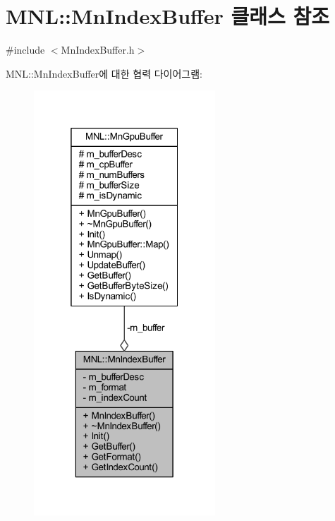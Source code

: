 \hypertarget{class_m_n_l_1_1_mn_index_buffer}{}\section{M\+NL\+:\+:Mn\+Index\+Buffer 클래스 참조}
\label{class_m_n_l_1_1_mn_index_buffer}


{\ttfamily \#include $<$Mn\+Index\+Buffer.\+h$>$}



M\+NL\+:\+:Mn\+Index\+Buffer에 대한 협력 다이어그램\+:\nopagebreak
\begin{figure}[H]
\begin{center}
\leavevmode
\includegraphics[width=193pt]{class_m_n_l_1_1_mn_index_buffer__coll__graph}
\end{center}
\end{figure}
